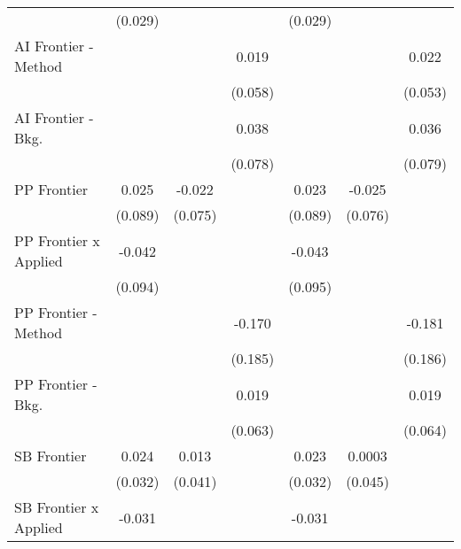 \begin{tabular}{lcccccc}
                                & (0.029)        &                &                & (0.029)        &                &   \\   
   AI Frontier - Method         &                &                & 0.019          &                &                & 0.022\\   
                                &                &                & (0.058)        &                &                & (0.053)\\   
   AI Frontier - Bkg.           &                &                & 0.038          &                &                & 0.036\\   
                                &                &                & (0.078)        &                &                & (0.079)\\   
   PP Frontier                  & 0.025          & -0.022         &                & 0.023          & -0.025         &   \\   
                                & (0.089)        & (0.075)        &                & (0.089)        & (0.076)        &   \\   
   PP Frontier x Applied        & -0.042         &                &                & -0.043         &                &   \\   
                                & (0.094)        &                &                & (0.095)        &                &   \\   
   PP Frontier - Method         &                &                & -0.170         &                &                & -0.181\\   
                                &                &                & (0.185)        &                &                & (0.186)\\   
   PP Frontier - Bkg.           &                &                & 0.019          &                &                & 0.019\\   
                                &                &                & (0.063)        &                &                & (0.064)\\   
   SB Frontier                  & 0.024          & 0.013          &                & 0.023          & 0.0003         &   \\   
                                & (0.032)        & (0.041)        &                & (0.032)        & (0.045)        &   \\   
   SB Frontier x Applied        & -0.031         &                &                & -0.031         &                &   \\   

\end{tabular}
